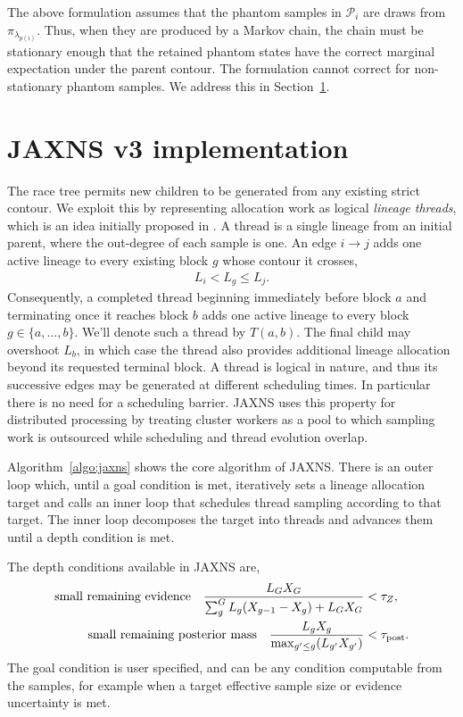 \documentclass[pdflatex,sn-basic,icol]{sn-jnl}
\theoremstyle{plain}
\theoremstyle{definition}
\begin{document}
The above formulation assumes that the phantom samples in $\mathcal{P}_i$ are draws from $\pi_{\lambda_{p(i)}}$.
Thus, when they are produced by a Markov chain, the chain must be stationary enough that the retained phantom states have the correct marginal expectation under the parent contour.
The formulation cannot correct for non-stationary phantom samples.
We address this in Section~\ref{sec:v3}.


\section{JAXNS v3 implementation}\label{sec:v3}

The race tree permits new children to be generated from any existing strict contour. We exploit this by representing allocation work as logical \textit{lineage threads}, which is an idea initially proposed in \citep{2019S&C....29..891H}.
A thread is a single lineage from an initial parent, where the out-degree of each sample is one.
An edge $i \to j$ adds one active lineage to every existing block $g$ whose contour it crosses, \begin{align}
L_{i}<L_g\le L_j. \label{eq:edge_lineage_coverage}
\end{align}
Consequently, a completed thread beginning immediately before block $a$ and terminating once it reaches block $b$ adds one active lineage to every block $g\in\{a,\ldots,b\}$.
We'll denote such a thread by $T(a,b)$.
The final child may overshoot $L_b$, in which case the thread also provides additional lineage allocation beyond its requested terminal block.
A thread is logical in nature, and thus its successive edges may be generated at different scheduling times.
In particular there is no need for a scheduling barrier.
JAXNS uses this property for distributed processing by treating cluster workers as a pool to which sampling work is outsourced while scheduling and thread evolution overlap.

Algorithm~\ref{algo:jaxns} shows the core algorithm of JAXNS.
There is an outer loop which, until a goal condition is met, iteratively sets a lineage allocation target and calls an inner loop that schedules thread sampling according to that target.
The inner loop decomposes the target into threads and advances them until a depth condition is met.

The depth conditions available in JAXNS are,
\begin{align}
    \text{small remaining evidence}\quad
    \frac{L_G X_G}{\sum_g^G L_g(X_{g-1} - X_g) + L_G X_G}
    &< \tau_Z,
    \label{eq:small_remaining_evidence}
    \\
    \text{small remaining posterior mass}\quad
    \frac{L_gX_g}{\max_{g'\le g}(L_{g'}X_{g'})}
    &< \tau_{\rm post}.
\end{align}
The goal condition is user specified, and can be any condition computable from the samples, for example when a target effective sample size or evidence uncertainty is met.
\end{document}
